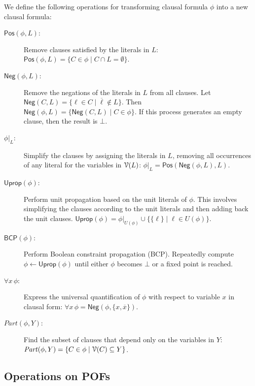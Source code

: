 \documentclass[letterpaper,USenglish,cleveref, autoref, thm-restate]{lipics-v2021}
\newcommand{\nil}{\bot}
\newcommand{\obar}[1]{\overline{#1}}
\newcommand{\lit}{\ell}
\newcommand{\dependencyset}{{\cal V}}
\newcommand{\simplify}[2]{#1|_{#2}}
\newcommand{\ureduce}[2]{\forall #2\, #1}
\newcommand{\partition}[2]{\mathit{Part}(#1, #2)}
\newcommand{\algo}[1]{\textsf{#1}}
\newcommand{\posop}{\algo{Pos}}
\newcommand{\negop}{\algo{Neg}}
\newcommand{\bcp}{\algo{BCP}}
\newcommand{\uprop}{\algo{Uprop}}
\begin{document}
We define the following operations for transforming clausal formula $\phi$ into a new clausal formula:
\begin{description}
\item[$\posop(\phi, L)$:] Remove clauses satisfied by the literals in $L$: $\posop(\phi, L) = \{ C \in \phi \mid C \cap L = \emptyset\}$.

\item[$\negop(\phi, L)$:] Remove the negations of the literals in $L$ from all clauses.  Let $\negop(C, L) = \{ \lit \in C \mid  \obar{\lit} \not \in L\}$.
  Then $\negop(\phi, L) = \{ \negop(C, L) \mid  C \in \phi \}$.  If this process generates an empty clause, then the result is $\nil$.

\item[$\simplify{\phi}{L}$:] Simplify the clauses by assigning the literals in $L$, removing all occurrences of any literal for the variables in $\dependencyset(L)$:
$\simplify{\phi}{L} = \posop(\negop(\phi, L), L)$. 

\item[$\uprop(\phi)$:]  Perform unit propagation based on the unit literals of $\phi$.  This involves simplifying the clauses according to the unit literals and then adding back the unit clauses.
$\uprop(\phi) = \simplify{\phi}{U(\phi)} \cup \{ \{\lit \} \mid  \lit \in U(\phi) \}$.

\item[$\bcp(\phi)$:] Perform Boolean constraint propagation (BCP).
  Repeatedly compute $\phi \leftarrow \uprop(\phi)$ until either $\phi$ becomes $\nil$ or a fixed point is reached.

\item[$\ureduce{\phi}{x}$:] Express the universal quantification of $\phi$ with respect to variable $x$ in clausal form:
$\ureduce{\phi}{x} = \negop(\phi, \{x, \obar{x}\})$.

\item[$\partition{\phi}{Y}$:] Find the subset of clauses that depend only on the variables in $Y$:
$\partition{\phi}{Y} = \{ C \in \phi \mid \dependencyset(C) \subseteq Y\}$.

\end{description}

\subsection{Operations on POFs}
\end{document}
